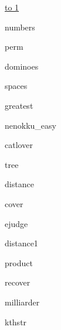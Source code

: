 \documentclass[12pt,a4paper,oneside]{article}
\newcommand{\ProblemLabel}{undefined}
\newcommand{\ProblemTL}{undefined}
\newcommand{\ProblemML}{undefined}
\newcommand{\ProblemName}{undefined}
\def\probl#1#2#3#4#5{
  \renewcommand{\ProblemName}{#2}
  \renewcommand{\ProblemLabel}{#3}
  \renewcommand{\ProblemTL}{#4}
  \renewcommand{\ProblemML}{#5}
  {#2}
}
\begin{document}
\vspace*{-2em}
\tableofcontents

\vspace*{1em}

\noindent \underline{\hbox to 1\textwidth{{ } \hfil{ } \hfil{ } }}

\pagebreak


\probl{2011-11}{numbers}{A}{0.5 sec}{256 mb}      %
\probl{2011-10b}{perm}{B}{0.5 sec}{256 mb}        %
\probl{2011-03}{dominoes}{C}{0.5 sec}{256 mb}     %
\probl{2011-11}{spaces}{D}{0.5 sec}{256 mb}       %
\probl{2011-10}{greatest}{E}{0.5 sec}{256 mb}     %
\probl{2011-04}{nenokku_easy}{F}{0.5 sec}{256 mb} %
\probl{2011-10}{catlover}{G}{0.5 sec}{256 mb}     %
\probl{2011-10}{tree}{H}{0.5 sec}{256 mb}         %
\probl{2014-03}{distance}{I}{0.5 sec}{256 mb}     %
\probl{2012-07}{cover}{J}{0.5 sec}{256 mb}        %
\probl{2012-07}{ejudge}{K}{0.5 sec}{256 mb}       %
\probl{2010-12}{distance1}{L}{0.5 sec}{256 mb}    %
\probl{2011-10}{product}{M}{0.5 sec}{256 mb}      %
\probl{2012-08}{recover}{N}{0.5 sec}{256 mb}      %
\probl{2015-02}{milliarder}{O}{0.5 sec}{256 mb}   %
\probl{2014-07}{kthstr}{P}{0.5 sec}{256 mb}       %
\end{document}
